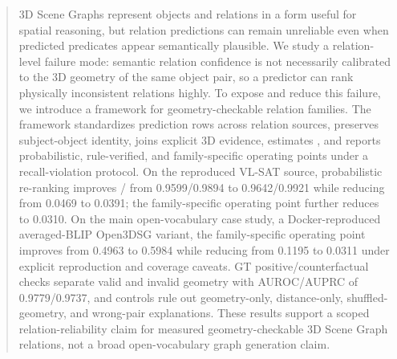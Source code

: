 \begin{abstract}
3D Scene Graphs represent objects and relations in a form useful for spatial
reasoning, but relation predictions can remain unreliable even when predicted
predicates appear semantically plausible. We study a relation-level failure
mode: semantic relation confidence is not necessarily calibrated to the 3D
geometry of the same object pair, so a predictor can rank physically
inconsistent relations highly. To expose and reduce this failure, we introduce
a \method{} framework for geometry-checkable relation families. The framework
standardizes prediction rows across relation sources, preserves subject-object
identity, joins explicit 3D evidence, estimates \pgeom{}, and reports
probabilistic, rule-verified, and family-specific operating points under a
recall-violation protocol. On the reproduced VL-SAT source, probabilistic
re-ranking improves / from 0.9599/0.9894 to 0.9642/0.9921
while reducing  from 0.0469 to 0.0391; the family-specific operating
point further reduces  to 0.0310. On the main open-vocabulary case
study, a Docker-reproduced averaged-BLIP Open3DSG variant, the family-specific
operating point improves  from 0.4963 to 0.5984 while reducing
 from 0.1195 to 0.0311 under explicit reproduction and coverage
caveats. GT positive/counterfactual checks
separate valid and invalid geometry with AUROC/AUPRC of 0.9779/0.9737, and
controls rule out geometry-only, distance-only, shuffled-geometry, and
wrong-pair explanations. These results support a scoped
relation-reliability claim for measured geometry-checkable 3D Scene Graph
relations, not a broad open-vocabulary graph generation claim.
\end{abstract}

